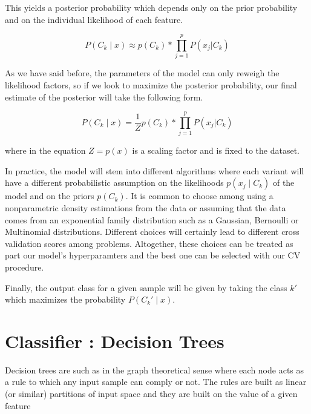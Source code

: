 This yields a posterior probability which depends only on the prior probability and on the individual likelihood of each feature.

\begin{equation}
P(C_k \mid x) \approx p(C_k) * \prod_{j=1}^{p}    P(x_j | C_k)
\end{equation}\label{equation-posteriorProbabilityDecomposition2}

As we have said before, the parameters of the model can only reweigh the likelihood factors, so if we look to maximize the posterior probability, our final estimate of the posterior will take the following form.

\begin{equation}
P(C_k \mid x) = \frac{1}{Z} p(C_k) * \prod_{j=1}^{p}    P(x_j | C_k)
\end{equation}\label{equation-posteriorProbabilityDecomposition3}

where in the equation $Z = p(x)$ is a scaling factor and is fixed to the dataset.

In practice, the model will stem into different algorithms where each variant will have a different probabilistic assumption on the likelihoods $p(x_j \mid C_k)$ of the model and on the priors $p(C_k)$. It is common to choose among using a nonparametric density estimations from the data or assuming that the data comes from an exponential family distribution such as a Gaussian, Bernoulli or Multinomial distributions. Different choices will certainly lead to different cross validation scores among problems. Altogether, these choices can be treated as part our model's hyperparamters and the best one can be selected with our CV procedure.


Finally, the output class for a given sample will be given by taking the class $k'$ which maximizes the probability  $P(C_k' \mid x)$.

\section{Classifier : Decision Trees}


Decision trees are such as in the graph theoretical sense where each node acts as a rule to which any input sample can comply or not. The rules are built as linear (or similar) partitions of input space and they are built on the value of a given feature

